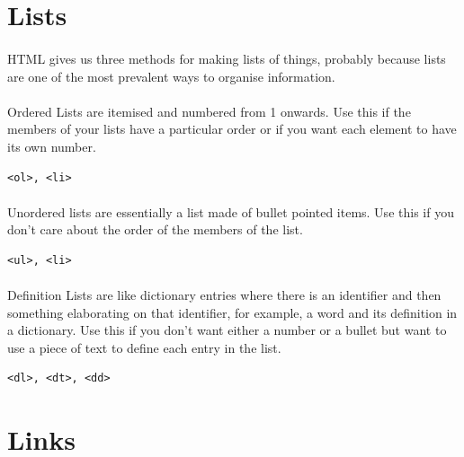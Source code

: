 \section{Lists}
\paragraph{} HTML gives us three methods for making lists of things, probably because lists are one of the most prevalent ways to organise information.
\paragraph{} Ordered Lists are itemised and numbered from 1 onwards. Use this if the members of your lists have a particular order or if you want each element to have its own number.
\begin{lstlisting}
<ol>, <li> 
\end{lstlisting}

\paragraph{} Unordered lists are essentially a list made of bullet pointed items. Use this if you don't care about the order of the members of the list.
\begin{lstlisting}
<ul>, <li> 
\end{lstlisting}

\paragraph{} Definition Lists are like dictionary entries where there is an identifier and then something elaborating on that identifier, for example, a word and its definition in a dictionary. Use this if you don't want either a number or a bullet but want to use a piece of text to define each entry in the list.
\begin{lstlisting}
<dl>, <dt>, <dd>
\end{lstlisting}

\section{Links}
